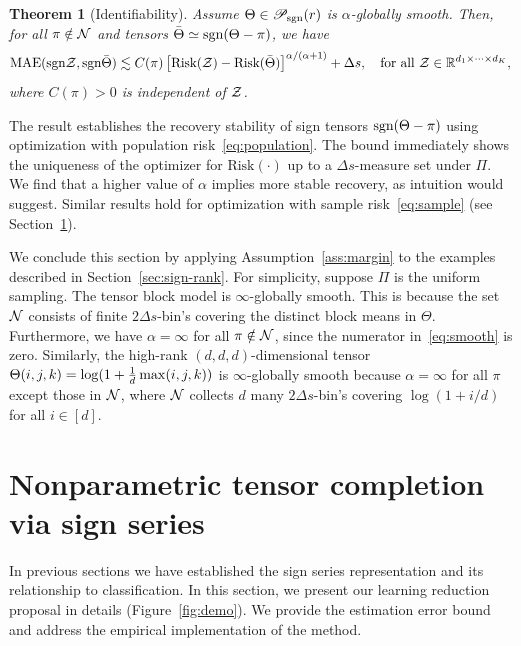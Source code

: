 \documentclass{article}
\theoremstyle{plain}
\newtheorem{thm}{Theorem}
\theoremstyle{definition}
\def\sign{\textup{sgn}}
\def\caliP{\mathscr{P}_{\textup{sgn}}}
\begin{document}
\vspace{.05cm}
\begin{thm}[Identifiability]\label{thm:population}Assume $\Theta\in\caliP(r)$ is $\alpha$-globally smooth. Then, for all $\pi\notin\mathcal{N}$ and tensors $\bar \Theta \simeq \sign(\Theta-\pi)$, we have
\[
\textup{MAE}(\sign \tZ, \sign \bar \Theta) \lesssim C(\pi)\left[\textup{Risk}(\tZ)-\textup{Risk}( \bar \Theta)\right]^{\alpha/(\alpha+1)}+\Delta s, \quad \text{for all }\tZ\in\mathbb{R}^{d_1\times \cdots \times d_K},
\]
where $C(\pi)>0$ is independent of $\mathcal{Z}$. 
\end{thm}
The result establishes the recovery stability of sign tensors $\sign (\Theta-\pi)$ using optimization with population risk~\eqref{eq:population}. The bound immediately shows the uniqueness of the optimizer for $\text{Risk}(\cdot)$ up to a  $\Delta s$-measure set under $\Pi$. We find that a higher value of $\alpha$ implies more stable recovery, as intuition would suggest. Similar results hold for optimization with sample risk~\eqref{eq:sample} (see Section~\ref{sec:estimation}). 

We conclude this section by applying Assumption~\ref{ass:margin} to the examples described in Section~\ref{sec:sign-rank}. For simplicity, suppose $\Pi$ is the uniform sampling. 
The tensor block model is $\infty$-globally smooth. This is because the set $\mathcal{N}$ consists of finite $2\Delta s$-bin's covering the distinct block means in $\Theta$. Furthermore, we have $\alpha= \infty$ for all $\pi \notin \mathcal{N}$, since the numerator in~\eqref{eq:smooth} is zero. Similarly, the high-rank $(d,d,d)$-dimensional tensor $\Theta(i,j,k) = \log(1+{1\over d}\max(i,j,k))$ is $\infty$-globally smooth because $\alpha=\infty$ for all $\pi$ except those in $\mathcal{N}$, where $\mathcal{N}$ collects $d$ many $2\Delta s$-bin's covering $\log(1+i/d)$ for all $i \in[d]$.


\section{Nonparametric tensor completion via sign series}\label{sec:estimation}

In previous sections we have established the sign series representation and its relationship to classification. In this section, we present our learning reduction proposal in details (Figure~\ref{fig:demo}). We provide the estimation error bound and address the empirical implementation of the method. 
\vspace{-.2cm}
\end{document}
